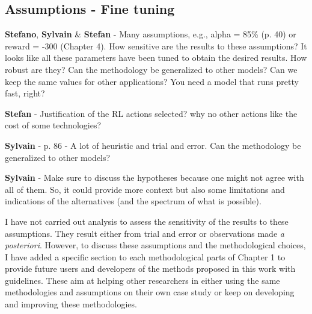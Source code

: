 \documentclass[12pt,a4paper]{article}
\begin{document}
\subsection{Assumptions - Fine tuning}
\label{fine_tuning}

\begin{mdframed}[style=comment] %
{\color{orange} \textbf{Stefano}}, {\color{purple} \textbf{Sylvain}} \& {\color{teal} \textbf{Stefan}} - Many assumptions, e.g., alpha = 85\% (p. 40) or reward = -300 (Chapter 4). How sensitive are the results to these assumptions? It looks like all these parameters have been tuned to obtain the desired results. How robust are they? Can the methodology be generalized to other models? Can we keep the same values for other applications? You need a model that runs pretty fast, right?

{\color{teal} \textbf{Stefan}} - Justification of the RL actions selected? why no other actions like the cost of some technologies?

{\color{purple} \textbf{Sylvain}} - p. 86 - A lot of heuristic and trial and error. Can the methodology be generalized to other models?

{\color{purple} \textbf{Sylvain}} - Make sure to discuss the hypotheses because one might not agree with all of them. So, it could provide more context but also some limitations and indications of the alternatives (and the spectrum of what is possible).
\end{mdframed}

\noindent I have not carried out analysis to assess the sensitivity of the results to these assumptions. They result either from trial and error or observations made \textit{a posteriori}. However, to discuss these assumptions and the methodological choices, I have added a specific section to each methodological parts of Chapter 1 to provide future users and developers of the methods proposed in this work with guidelines. These aim at helping other researchers in either using the same methodologies and assumptions on their own case study or keep on developing and improving these methodologies.
\end{document}
